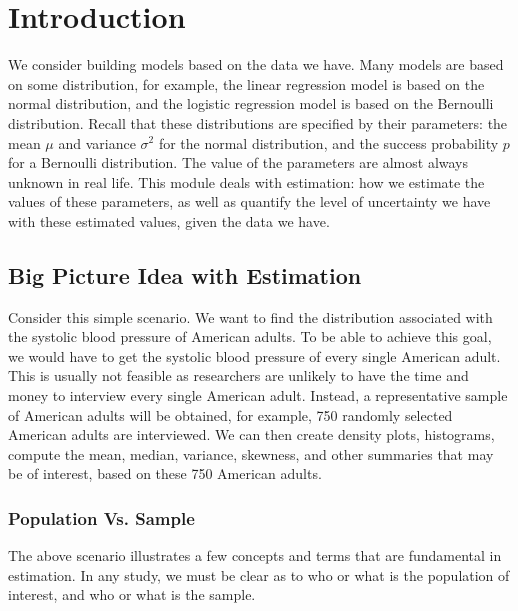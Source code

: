\documentclass[
]{book}
\begin{document}
\hypertarget{introduction-3}{%
\section{Introduction}\label{introduction-3}}

We consider building models based on the data we have. Many models are based on some distribution, for example, the linear regression model is based on the normal distribution, and the logistic regression model is based on the Bernoulli distribution. Recall that these distributions are specified by their parameters: the mean \(\mu\) and variance \(\sigma^2\) for the normal distribution, and the success probability \(p\) for a Bernoulli distribution. The value of the parameters are almost always unknown in real life. This module deals with estimation: how we estimate the values of these parameters, as well as quantify the level of uncertainty we have with these estimated values, given the data we have.

\hypertarget{big-picture-idea-with-estimation}{%
\subsection{Big Picture Idea with Estimation}\label{big-picture-idea-with-estimation}}

Consider this simple scenario. We want to find the distribution associated with the systolic blood pressure of American adults. To be able to achieve this goal, we would have to get the systolic blood pressure of every single American adult. This is usually not feasible as researchers are unlikely to have the time and money to interview every single American adult. Instead, a representative sample of American adults will be obtained, for example, 750 randomly selected American adults are interviewed. We can then create density plots, histograms, compute the mean, median, variance, skewness, and other summaries that may be of interest, based on these 750 American adults.

\hypertarget{population-vs.-sample}{%
\subsubsection{Population Vs. Sample}\label{population-vs.-sample}}

The above scenario illustrates a few concepts and terms that are fundamental in estimation. In any study, we must be clear as to who or what is the population of interest, and who or what is the sample.
\end{document}
